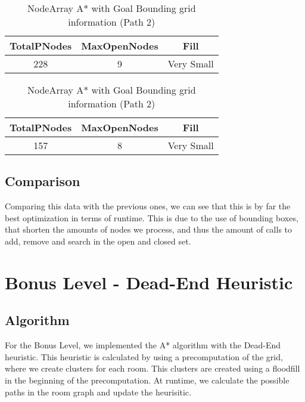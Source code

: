 \documentclass{article}
\begin{document}
  \begin{table}[h!]
    \parbox{.45\linewidth}{
        \centering
        \caption{NodeArray A* with Goal Bounding grid information (Path 1)}
        \label{tab:tableGoalBoundingGrid1}
        \begin{tabular}{c|c|c}
          \textbf{TotalPNodes} & \textbf{MaxOpenNodes} & \textbf{Fill}\\
          \hline
          228 & 9 & Very Small\\
        \end{tabular}
    }
    \hfil
    \parbox{.45\linewidth}{
        \centering
        \caption{NodeArray A* with Goal Bounding grid information (Path 2)}
        \label{tab:tableGoalBoundingGrid2}
        \begin{tabular}{c|c|c}
          \textbf{TotalPNodes} & \textbf{MaxOpenNodes} & \textbf{Fill}\\
          \hline
          157 & 8 & Very Small\\
        \end{tabular}
    }
  \end{table}

  \subsection{Comparison}
  Comparing this data with the previous ones, we can see that this is by far the best optimization in terms of runtime. This is due to the use of bounding boxes,
  that shorten the amounts of nodes we process, and thus the amount of calls to add, remove and search in the open and closed set.\\

  \section{Bonus Level - Dead-End Heuristic}

  \subsection{Algorithm}
  For the Bonus Level, we implemented the A* algorithm with the Dead-End heuristic. This heuristic is calculated by using a precomputation of the grid, where we
  create clusters for each room. This clusters are created using a floodfill in the beginning of the precomputation. At runtime, we calculate the possible paths 
  in the room graph and update the heurisitic.\\
  
\end{document}
